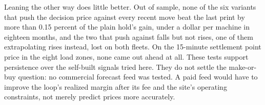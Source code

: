 Leaning the other way does little better. Out of sample, none of the six variants that push the decision price against every recent move beat the last print by more than 0.15 percent of the plain hold's gain, under a dollar per machine in eighteen months, and the two that push against falls but not rises, one of them extrapolating rises instead, lost on both fleets. On the 15-minute settlement point price in the eight load zones, none came out ahead at all. %
These tests support persistence over the self-built signals tried here. They do not settle the make-or-buy question: no commercial forecast feed was tested. A paid feed would have to improve the loop's realized margin after its fee and the site's operating constraints, not merely predict prices more accurately.


